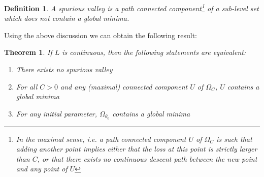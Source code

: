 \documentclass[11pt]{article} %
\newtheorem{theorem}{Theorem}[section]
\newtheorem{definition}{Definition}[section]
\begin{document}
\begin{definition}
A \emph{spurious valley} is a path connected component\footnote{In the maximal sense, i.e. a path connected component $U$ of $\Omega_C$ is such that adding another point implies either that the loss at this point is strictly larger than $C$, or that there exists no \emph{continuous} descent path between the new point and any point of $U$} of a sub-level set which does not contain a global minima.
\end{definition}
Using the above discussion we can obtain the following result:
\begin{theorem}
	If $L$ is continuous, then the following statements are equivalent:
	\begin{enumerate}
		\item There exists no spurious valley
		\item For all $C>0$ and any (maximal) connected component $U$ of $\Omega_C$, $U$ contains a global minima
		\item For any initial parameter, $\Omega_{\theta_0}$ contains a global minima
	\end{enumerate}
\end{theorem}
\end{document}
